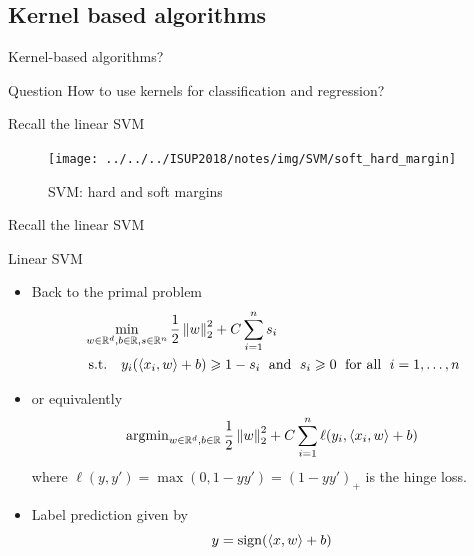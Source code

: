 \documentclass[xcolor={usenames,dvipsnames}]{beamer}
\begin{document}
 
 
 
 
 
 
 
\subsection{Kernel based algorithms}



\begin{frame}{Kernel-based algorithms?}

  \begin{alertblock}{Question}
  How to use kernels for classification and regression?
  \end{alertblock}
  
  
  
  \pause
  
Recall the linear SVM

\begin{figure}
  \begin{center}
     \texttt{[image: ../../../ISUP2018/notes/img/SVM/soft\_hard\_margin]} 
     \caption{SVM: hard and soft margins}
  \end{center}  
\end{figure}    
 \end{frame}
 
 
 \begin{frame}{Recall the linear SVM}  
\begin{block}{Linear SVM}

\begin{itemize}
\item  Back to the primal problem
  \begin{align*}
    &\min_{w \in \mathbb{R}^d, b \in \mathbb{R}, s \in \mathbb{R}^n} \frac 12 \left\| w \right\|_2^2 
    + C \sum_{i=1}^n s_i \\
    &\text{ s.t. } \;\;  y_i ({\langle x_i, w \rangle} + b) \geqslant 1 - s_i \; 
    \text{ and } \; s_i \geqslant 0 \; \text{ for all }  \;i=1, \ldots, n
  \end{align*}
\item   or equivalently
  \begin{equation*}
    \operatorname{argmin}_{w \in \mathbb{R}^d, b \in \mathbb{R}} \frac 12 \left\| w \right\|_2^2 + C 
    \sum_{i=1}^n \ell(y_i, {\langle x_i, w \rangle} + b)
  \end{equation*}
  where $\ell(y, y') = \max(0, 1 - y y') = (1 - y y')_+$ is the hinge loss.
\item Label prediction given by
  \begin{equation*}
    y = \operatorname{sign}({\langle x, w \rangle} + b)
  \end{equation*}
  \end{itemize}
    \end{block}
    
    \end{frame}
 
\end{document}
